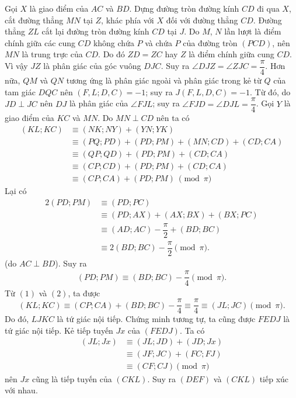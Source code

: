 \begin{bt}
{\begin{center}
\end{center}
Gọi $X$ là giao điểm của $AC$ và $BD$. Dựng đường tròn đường kính $CD$ đi qua $X$, cắt đường thẳng $MN$ tại $Z$, khác phía với $X$ đối với đường thẳng $CD$. Đường thẳng $ZL$ cắt lại đường tròn đường kính $CD$ tại $J$.
Do $M$, $N$ lần lượt là điểm chính giữa các cung $CD$ không chứa $P$ và chứa $P$ của đường tròn $(PCD)$, nên $MN$ là trung trực của $CD$. Do đó $ZD=ZC$ hay $Z$ là điểm chính giữa cung $CD$. Vì vậy $JZ$ là phân giác của góc vuông $DJC$. Suy ra $\angle DJZ=\angle ZJC=\dfrac{\pi}{4}$.
Hơn nữa, $QM$ và $QN$ tương ứng là phân giác ngoài và phân giác trong kẻ từ $Q$ của tam giác $DQC$ nên $(F,L;D,C)=-1$; suy ra $J(F,L,D,C)=-1$. Từ đó, do $JD\perp JC$ nên $DJ$ là phân giác của $\angle FJL$; suy ra $\angle FJD=\angle DJL=\dfrac{\pi}{4}$. Gọi $Y$ là giao điểm của $KC$ và $MN$. Do $MN\perp CD$ nên ta có
{\allowdisplaybreaks
\begin{align*}(KL;KC)&\equiv (NK;NY)+(YN;YK)\\
&\equiv (PQ;PD)+(PD;PM)+(MN;CD)+(CD;CA)\\
&\equiv (QP;QD)+(PD;PM)+(CD;CA)\\
&\equiv (CP;CD)+(PD;PM)+(CD;CA)\\
&\equiv (CP;CA)+(PD;PM)\ \pmod\pi\tag{1}
\end{align*}}
Lại có
{\allowdisplaybreaks
\begin{align*}2(PD;PM)&\equiv (PD;PC)\\
&\equiv (PD;AX)+(AX;BX)+(BX;PC)\\
&\equiv (AD;AC)-\dfrac{\pi}{2}+(BD;BC)\\
&\equiv 2(BD;BC)-\dfrac{\pi}{2} \pmod\pi.
\end{align*}}(do $AC\perp BD$). Suy ra \begin{align*}(PD;PM)\equiv (BD;BC)-\dfrac{\pi}{4} \pmod\pi.\tag{2}\end{align*}
Từ $(1)$ và $(2)$, ta được
$$(KL;KC)\equiv (CP;CA)+(BD;BC)-\dfrac{\pi}{4}\equiv \dfrac{\pi}{4}\equiv (JL;JC) \pmod\pi.$$
Do đó, $LJKC$ là tứ giác nội tiếp. Chứng minh tương tự, ta cũng được $FEDJ$ là tứ giác nội tiếp. Kẻ tiếp tuyến $Jx$ của $(FEDJ)$. Ta có
{\allowdisplaybreaks
\begin{align*}
(JL;Jx)&\equiv (JL;JD)+(JD;Jx)\\
&\equiv (JF;JC)+(FC;FJ)\\
&\equiv (CF;CJ) \pmod\pi
\end{align*}}nên $Jx$ cũng là tiếp tuyến của $(CKL)$. Suy ra $(DEF)$ và $(CKL)$ tiếp xúc với nhau.\\
}
\end{bt}
